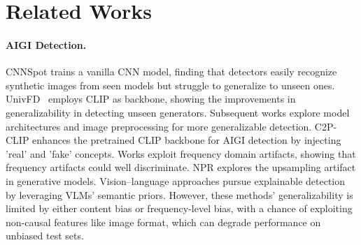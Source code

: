 \documentclass{article}
\begin{document}
\vspace{-10pt}
\section{Related Works}

\paragraph{AIGI Detection.} CNNSpot \cite{wang2020cnn} trains a vanilla CNN model, finding that detectors easily recognize synthetic images from seen models but struggle to generalize to unseen ones. UnivFD~\cite{ojha2023towards} employs CLIP as backbone, showing the improvements in generalizability in detecting unseen generators. Subsequent works \cite{lin2025standing,tan2024c2p,zheng2024breaking,yanorthogonal} explore model architectures and image preprocessing for more generalizable detection. C2P-CLIP enhances the pretrained CLIP backbone for AIGI detection by injecting 'real' and 'fake' concepts. Works \cite{tan2024frequency,chu2024fire,li2024improving,karageorgiou2024any,zhou2023exposing} exploit frequency domain artifacts, showing that frequency artifacts could well discriminate. NPR \cite{tan2024rethinking} explores the upsampling artifact in generative models. Vision–language approaches \cite{lin2025guard,he2025vlforgery,lin2025seeing,chen2024x2,xu2025avatarshield,xu2025fakeshield} pursue explainable detection by leveraging VLMs’ semantic priors.
However, these methods' generalizability is limited by either content bias or frequency-level bias, with a chance of exploiting non-causal features like image format, which can degrade performance on unbiased test sets.
\end{document}
